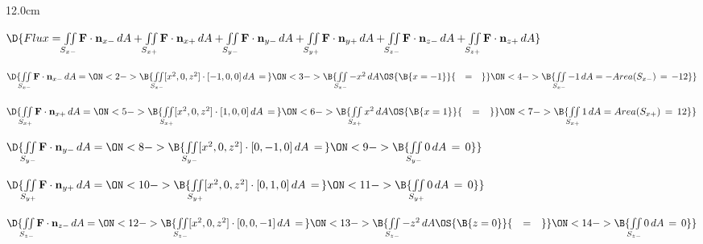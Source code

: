 \begin{frame}
\begin{columns}\begin{column}{12.0cm}
\scriptsize

$\D{Flux = \iint \limits_{S_{x-}} {\bf F} \cdot {\bf n}_{x-}\, dA + \iint \limits_{S_{x+}} {\bf F} \cdot {\bf n}_{x+}\, dA + \iint \limits_{S_{y-}} {\bf F} \cdot {\bf n}_{y-}\, dA + \iint \limits_{S_{y+}} {\bf F} \cdot {\bf n}_{y+}\, dA + \iint \limits_{S_{z-}} {\bf F} \cdot {\bf n}_{z-}\, dA + \iint \limits_{S_{z+}} {\bf F} \cdot {\bf n}_{z+}\, dA}$

\vspace{0.4cm}

$\D{\iint \limits_{S_{x-}} {\bf F} \cdot {\bf n}_{x-}\, dA = 
\ON<2->{\B{\iint \limits_{S_{x-}} [x^2,0,z^2] \cdot [-1,0,0]\, dA \,=\, }}
\ON<3->{\B{\iint \limits_{S_{x-}} -x^2 \, dA \OS{\B{x=-1}}{\quad=\quad} }}
\ON<4->{\B{\iint \limits_{S_{x-}} -1 \, dA = -Area(S_{x-}) \,=\, -12}}}$

\vspace{0.2cm}

$\D{\iint \limits_{S_{x+}} {\bf F} \cdot {\bf n}_{x+}\, dA = 
\ON<5->{\B{\iint \limits_{S_{x+}} [x^2,0,z^2] \cdot [1,0,0]\, dA \,=\, }}
\ON<6->{\B{\iint \limits_{S_{x+}} x^2 \, dA \OS{\B{x=1}}{\quad=\quad} }}
\ON<7->{\B{\iint \limits_{S_{x+}} 1 \, dA = Area(S_{x+}) \,=\, 12}}}$

\vspace{0.2cm}

$\D{\iint \limits_{S_{y-}} {\bf F} \cdot {\bf n}_{y-}\, dA = 
\ON<8->{\B{\iint \limits_{S_{y-}} [x^2,0,z^2] \cdot [0,-1,0]\, dA \,=\,}}
\ON<9->{\B{\iint \limits_{S_{y-}} 0 \, dA \, = \, 0 }}}$

\vspace{0.2cm}

$\D{\iint \limits_{S_{y+}} {\bf F} \cdot {\bf n}_{y+}\, dA = 
\ON<10->{\B{\iint \limits_{S_{y+}} [x^2,0,z^2] \cdot [0,1,0]\, dA \,=\,}}
\ON<11->{\B{\iint \limits_{S_{y+}} 0 \, dA \, = \, 0 }}}$

\vspace{0.2cm}

$\D{\iint \limits_{S_{z-}} {\bf F} \cdot {\bf n}_{z-}\, dA = 
\ON<12->{\B{\iint \limits_{S_{z-}} [x^2,0,z^2] \cdot [0,0,-1]\, dA \,=\, }}
\ON<13->{\B{\iint \limits_{S_{z-}} -z^2 \, dA \OS{\B{z=0}}{\quad=\quad} }}
\ON<14->{\B{\iint \limits_{S_{z-}} 0 \, dA \,=\, 0}}}$

\vspace{0.2cm}


\end{column}
\end{columns}
\end{frame}
